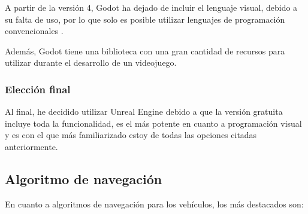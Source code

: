 \bigskip 

A partir de la versión 4, Godot ha dejado de incluir el lenguaje visual, debido a su falta de uso, por lo que solo es posible utilizar lenguajes de programación convencionales \cite{godot-no-visual}.

\bigskip

Además, Godot tiene una biblioteca con una gran cantidad de recursos para utilizar durante el desarrollo de un videojuego.


\subsubsection{Elección final}

Al final, he decidido utilizar Unreal Engine debido a que la versión gratuita incluye toda la funcionalidad, es el más potente en cuanto a programación visual y es con el que más familiarizado estoy de todas las opciones citadas anteriormente.

\subsection{Algoritmo de navegación}
En cuanto a algoritmos de navegación para los vehículos, los más destacados son:

